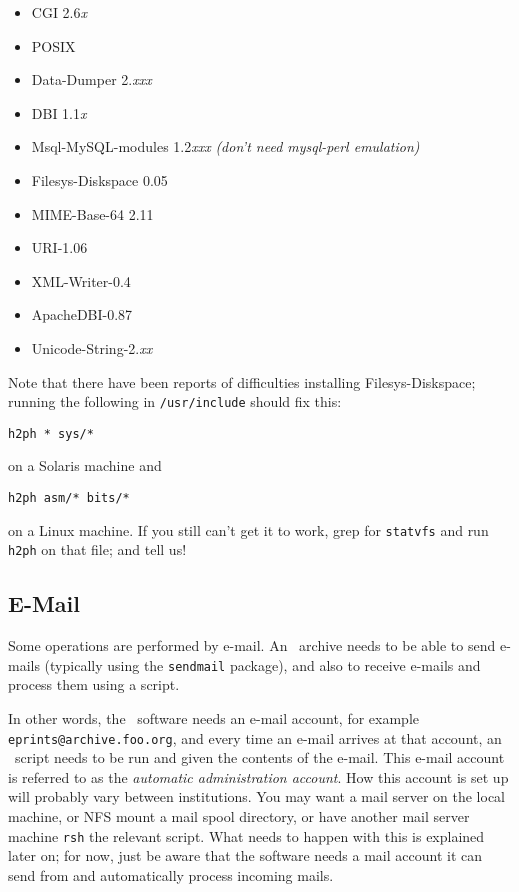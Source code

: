 \begin{itemize}
\item CGI 2.6\emph{x}
\item POSIX
\item Data-Dumper 2.\emph{xxx}
\item DBI 1.1\emph{x}
\item Msql-MySQL-modules 1.2\emph{xxx} \emph{(don't need mysql-perl emulation)}
\item Filesys-Diskspace 0.05
\item MIME-Base-64 2.11
\item URI-1.06
\item XML-Writer-0.4
\item ApacheDBI-0.87
\item Unicode-String-2.\emph{xx}
\end{itemize}

Note that there have been reports of difficulties installing Filesys-Diskspace; running the following in {\tt /usr/include} should fix this: 

\begin{verbatim}
h2ph * sys/*
\end{verbatim}

on a Solaris machine and

\begin{verbatim}
h2ph asm/* bits/*
\end{verbatim}

on a Linux machine. If you still can't get it to work, grep for {\tt statvfs} and run {\tt h2ph} on that file; and tell us!


\subsection{E-Mail}

Some operations are performed by e-mail. An \eprints\ archive needs to be able to send e-mails (typically using the {\tt sendmail} package), and also to receive e-mails and process them using a script.

In other words, the \eprints\ software needs an e-mail account, for example {\tt eprints@archive.foo.org}, and every time an e-mail arrives at that account, an \eprints\ script needs to be run and given the contents of the e-mail. This e-mail account is referred to as the \emph{automatic administration account}.
How this account is set up will probably vary between institutions. You may want a mail server on the local machine, or NFS mount a mail spool directory, or have another mail server machine {\tt rsh} the relevant script. What needs to happen with this is explained later on; for now, just be aware that the software needs a mail account it can send from and automatically process incoming mails.

